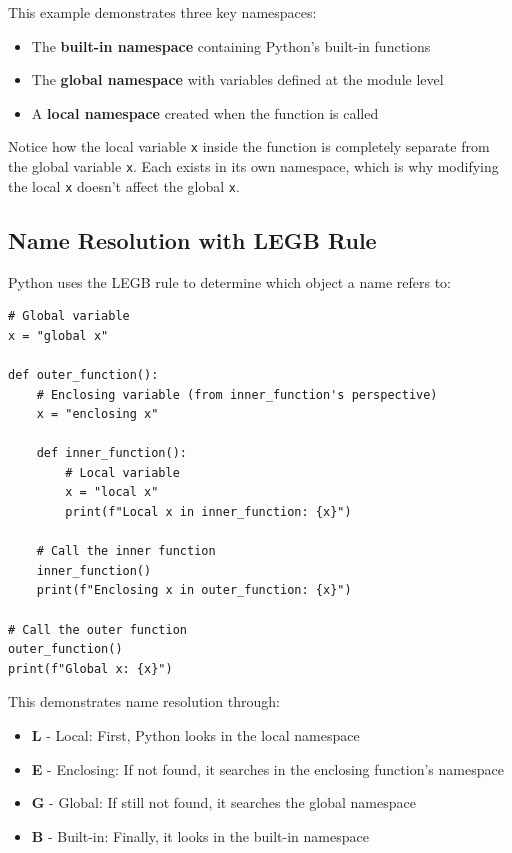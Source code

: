 \documentclass[12pt,letterpaper]{article}
\newenvironment{macterminal}{%
    \begin{mdframed}[
        linecolor=terminalFrame,
        backgroundcolor=terminalBg,
        roundcorner=5pt,
        skipabove=10pt,
        skipbelow=10pt,
        linewidth=1pt,
        innertopmargin=10pt, %
        frametitle={%
            \tikz[baseline=(current bounding box.east), outer sep=0pt]{
                \fill[red!80!black] (0,0) circle (5pt);
                \fill[yellow!80!black] (0.7,0) circle (5pt);
                \fill[green!70!black] (1.4,0) circle (5pt);
            }
        },
        frametitlealignment=\raggedright, %
        frametitleaboveskip=8pt, %
        frametitlebelowskip=0pt, %
    ]
}{%
    \end{mdframed}%
}
\begin{document}
This example demonstrates three key namespaces:
\begin{itemize}
    \item The \textbf{built-in namespace} containing Python's built-in functions
    \item The \textbf{global namespace} with variables defined at the module level
    \item A \textbf{local namespace} created when the function is called
\end{itemize}

Notice how the local variable \texttt{x} inside the function is completely separate from the global variable \texttt{x}. Each exists in its own namespace, which is why modifying the local \texttt{x} doesn't affect the global \texttt{x}.

\subsection{Name Resolution with LEGB Rule}

Python uses the LEGB rule to determine which object a name refers to:

\begin{macterminal}
\begin{lstlisting}
# Global variable
x = "global x"

def outer_function():
    # Enclosing variable (from inner_function's perspective)
    x = "enclosing x"
    
    def inner_function():
        # Local variable
        x = "local x"
        print(f"Local x in inner_function: {x}")
        
    # Call the inner function
    inner_function()
    print(f"Enclosing x in outer_function: {x}")

# Call the outer function
outer_function()
print(f"Global x: {x}")
\end{lstlisting}
\end{macterminal}

This demonstrates name resolution through:
\begin{itemize}
    \item \textbf{L} - Local: First, Python looks in the local namespace
    \item \textbf{E} - Enclosing: If not found, it searches in the enclosing function's namespace
    \item \textbf{G} - Global: If still not found, it searches the global namespace
    \item \textbf{B} - Built-in: Finally, it looks in the built-in namespace
\end{itemize}
\end{document}
